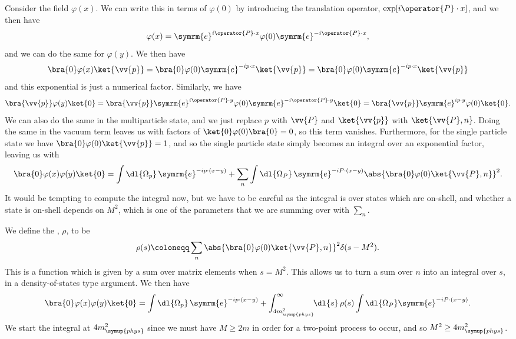 \documentclass[fleqn]{NotesClass}
\newcommand{\e}{\symrm{e}}
\newcommand{\phys}{\symup{phys}}
\begin{document}
    Consider the field \(\varphi(x)\).
    We can write this in terms of \(\varphi(0)\) by introducing the translation operator, \(\exp[i\operator{P} \cdot x]\), and we then have
    \begin{equation}
        \varphi(x) = \e^{i\operator{P} \cdot x} \varphi(0) \e^{-i\operator{P} \cdot x},
    \end{equation}
    and we can do the same for \(\varphi(y)\).
    We then have
    \begin{equation}
        \bra{0} \varphi(x) \ket{\vv{p}} = \bra{0} \varphi(0) \e^{-ip \cdot x} \ket{\vv{p}} = \bra{0} \varphi(0) \e^{-ip \cdot x} \ket{\vv{p}}
    \end{equation}
    and this exponential is just a numerical factor.
    Similarly, we have
    \begin{equation}
        \bra{\vv{p}} \varphi(y) \ket{0} = \bra{\vv{p}} \e^{i\operator{P} \cdot y} \varphi(0) \e^{-i\operator{P} \cdot y} \ket{0} = \bra{\vv{p}} \e^{ip \cdot y} \varphi(0) \ket{0}.
    \end{equation}
    We can also do the same in the multiparticle state, and we just replace \(p\) with \(\vv{P}\) and \(\ket{\vv{p}}\) with \(\ket{\vv{P}, n}\).
    Doing the same in the vacuum term leaves us with factors of \(\ket{0} \varphi(0) \bra{0} = 0\), so this term vanishes.
    Furthermore, for the single particle state we have \(\bra{0} \varphi(0) \ket{\vv{p}} = 1\), and so the single particle state simply becomes an integral over an exponential factor, leaving us with
    \begin{equation}
        \bra{0} \varphi(x) \varphi(y) \ket{0} = \int \dl{\Omega_p} \, \e^{-ip \cdot (x - y)} + \sum_n \int \dl{\Omega_P} \, \e^{-iP\cdot (x - y)} \abs{\bra{0} \varphi(0) \ket{\vv{P}, n}}^2.
    \end{equation}
    It would be tempting to compute the integral now, but we have to be careful as the integral is over states which are on-shell, and whether a state is on-shell depends on \(M^2\), which is one of the parameters that we are summing over with \(\sum_n\).
    
    We define the , \(\rho\), to be
    \begin{equation}
        \rho(s) \coloneqq \sum_n \abs{\bra{0} \varphi(0) \ket{\vv{P}, n}}^2 \delta(s - M^2).
    \end{equation}
    This is a function which is given by a sum over matrix elements when \(s = M^2\).
    This allows us to turn a sum over \(n\) into an integral over \(s\), in a density-of-states type argument.
    We then have
    \begin{equation}
        \bra{0} \varphi(x) \varphi(y) \ket{0} = \int \dl{\Omega_p} \, \e^{-ip\cdot (x - y)} + \int_{4m_{\phys}^2}^{\infty} \!\! \dl{s} \, \rho(s) \int \dl{\Omega_P} \e^{-iP \cdot (x - y)}.
    \end{equation}
    We start the integral at \(4m_{\phys}^2\) since we must have \(M \ge 2m\) in order for a two-point process to occur, and so \(M^2 \ge 4m_{\phys}^2\).
    
\end{document}
